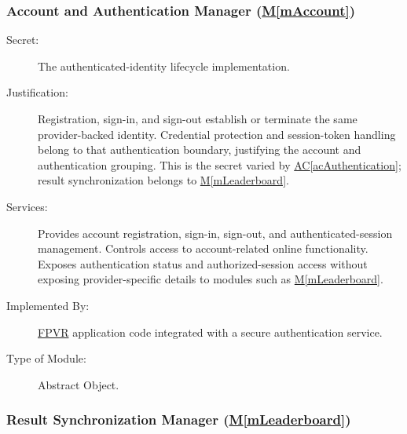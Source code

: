 \documentclass[12pt, titlepage]{article}
\DeclareRobustCommand{\mgabbr}[2]{\hyperlink{mg-abbr:#1}{#2}}
\newcommand{\acref}[1]{\mgabbr{ac}{AC}\ref{#1}}
\newcommand{\mref}[1]{\hyperref[#1]{M\ref*{#1}}}
\begin{document}
\subsubsection{Account and Authentication Manager (\mref{mAccount})}

\begin{description}

\item[Secret:]
The authenticated-identity lifecycle implementation.

\item[Justification:]
Registration, sign-in, and sign-out establish or terminate the same
provider-backed identity. Credential protection and session-token handling
belong to that authentication boundary, justifying the account and
authentication grouping. This is the secret varied by
\acref{acAuthentication}; result synchronization belongs to
\mref{mLeaderboard}.

\item[Services:]
Provides account registration, sign-in, sign-out,
and authenticated-session management. Controls access
to account-related online functionality. Exposes authentication status
and authorized-session access without exposing provider-specific
details to modules such as \mref{mLeaderboard}.

\item[Implemented By:]
\mgabbr{fpvr}{FPVR} application code integrated with a secure
authentication service.

\item[Type of Module:]
Abstract Object.

\end{description}


\subsubsection{Result Synchronization Manager (\mref{mLeaderboard})}
\end{document}
